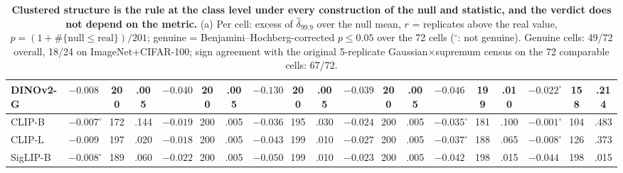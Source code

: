 \begin{table}[tbp]
\begin{tabular}{lcccccccccccccccccc}
DINOv2-G & $-0.008$ & 200 & .005 & $-0.040$ & 200 & .005 & $-0.130$ & 200 & .005 & $-0.039$ & 200 & .005 & $-0.046$ & 199 & .010 & $-0.022^{\circ}$ & 158 & .214 \\
\midrule
CLIP-B & $-0.007^{\circ}$ & 172 & .144 & $-0.019$ & 200 & .005 & $-0.036$ & 195 & .030 & $-0.024$ & 200 & .005 & $-0.035^{\circ}$ & 181 & .100 & $-0.001^{\circ}$ & 104 & .483 \\
CLIP-L & $-0.009$ & 197 & .020 & $-0.018$ & 200 & .005 & $-0.043$ & 199 & .010 & $-0.027$ & 200 & .005 & $-0.037^{\circ}$ & 188 & .065 & $-0.008^{\circ}$ & 126 & .373 \\
SigLIP-B & $-0.008^{\circ}$ & 189 & .060 & $-0.022$ & 200 & .005 & $-0.050$ & 199 & .010 & $-0.023$ & 200 & .005 & $-0.042$ & 198 & .015 & $-0.044$ & 198 & .015 \\
\bottomrule
\end{tabular}
\par\vspace{5pt}
\caption{\textbf{Clustered structure is the rule at the class level under every construction of the null and statistic, and the verdict does not depend on the metric.} (a) Per cell: excess of $\hat\delta_{99.9}$ over the null mean, $r$ = replicates above the real value, $p=(1+\#\{\text{null}\le\text{real}\})/201$; genuine = Benjamini--Hochberg-corrected $p\le0.05$ over the 72 cells ($^{\circ}$: not genuine). Genuine cells: 49/72 overall, 18/24 on ImageNet+CIFAR-100; sign agreement with the original 5-replicate Gaussian$\times$supremum census on the 72 comparable cells: 67/72.%
}
\label{tab:q1-census}
\end{table}
